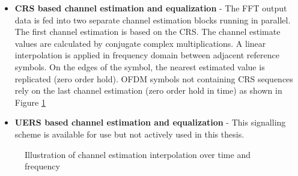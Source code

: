 \begin{itemize}
    \item \textbf{CRS based channel estimation and equalization} -
        The FFT output data is fed into two separate channel estimation blocks running in parallel. The first channel estimation is based on the CRS. The channel estimate values are calculated by conjugate complex multiplications. A linear interpolation is applied in frequency domain between adjacent reference symbols. On the edges of the symbol, the nearest estimated value is replicated (zero order hold). OFDM symbols not containing CRS sequences rely on the last channel estimation (zero order hold in time) as shown in Figure \ref{fig:ChEstInterpolation}
    \item \textbf{UERS based channel estimation and equalization} -
        This signalling scheme is available for use but not actively used in this thesis.
\end{itemize}

\begin{figure}%
    \centering
    \qquad
    \caption{Illustration of channel estimation interpolation over time and frequency}%
    \label{fig:ChEstInterpolation}%
\end{figure}

